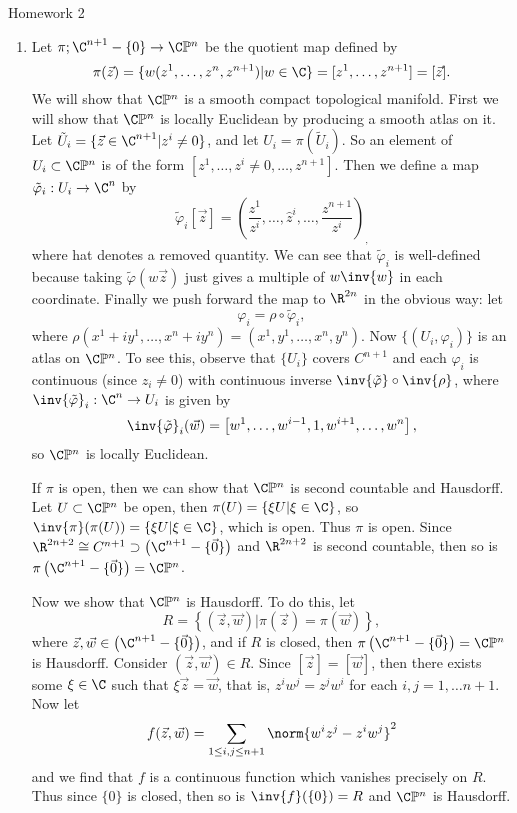 \documentclass[12pt,letterpaper]{article}
\newcommand{\CP}{\C\mathbb{P}}
\let\temp\phi
\let\phi\varphi
\let\varphi\temp
\begin{document}
\pagestyle{fancy}
\begin{center}
{\Large Homework 2}%
\end{center}

\begin{enumerate}
\item Let $\pi;\C^{n+1}-\{0\}\to\C\mathbb{P}^n$ be the quotient map defined by 
$$\pi(\vec{z})=\{w(z^1, \dots, z^n, z^{n+1}) | w\in\C\} = [z^1, \dots, z^{n+1}]=[\vec{z}].$$
We will show that $\CP^n$ is a smooth compact topological manifold. First we will show that $\CP^n$ is locally Euclidean by producing a smooth atlas on it. Let $\tilde{U}_i=\{\vec{z}\in\C^{n+1}|z^i\neq0\}$, and let $U_i=\pi\left(\tilde{U}_i\right)$. So an element of $U_i\subset \CP^n$ is of the form $[z^1, \dots, z^i\neq0, \dots, z^{n+1}]$. Then we define a map $\tilde{\phi}_i:U_i\to\C^n$ by 
$$\tilde{\phi}_i[\vec{z}]=\left(\frac{z^1}{z^i}, \dots, \hat{z}^i, \dots, \frac{z^{n+1}}{z^i} \right)_,$$
where hat denotes a removed quantity. 
We can see that $\tilde{\phi}_i$ is well-defined because taking $\tilde{\phi}(w\vec{z})$ just gives a multiple of $w\inv{w}$ in each coordinate. Finally we push forward the map to $\R^{2n}$ in the obvious way: let 
$$\phi_i=\rho\circ\tilde{\phi}_i,$$ 
where $\rho(x^1+iy^1, \dots, x^n+iy^n)=(x^1, y^1, \dots, x^n, y^n)$. 
Now $\{\left(U_i,\phi_i\right)\}$ is an atlas on $\CP^n$. 
To see this, observe that $\{U_i\}$ covers $C^{n+1}$ and each $\phi_i$ is continuous (since $z_i\neq0$) with continuous inverse $\inv{\tilde{\phi}}\circ\inv{\rho}$, where $\inv{\tilde{\phi}}_i:\C^n\to U_i$ is given by 
$$\inv{\tilde{\phi}}_i(\vec{w})=\left[w^1, \dots, w^{i-1}, 1, w^{i+1},\dots, w^n\right],$$
so $\CP^n$ is locally Euclidean. \qedwhite

If $\pi$ is open, then we can show that $\CP^n$ is second countable and Hausdorff. Let $U\subset\CP^n$ be open, then $\pi(U)=\{\xi U | \xi \in \C\}$, so $\inv{\pi}(\pi(U))=\{\xi U | \xi \in \C\}$, which is open. Thus $\pi$ is open. Since $\R^{2n+2}\cong C^{n+1} \supset \left(\C^{n+1}-\{\vec{0}\}\right)$ and $\R^{2n+2}$ is second countable, then so is $\pi\left(\C^{n+1}-\{\vec{0}\}\right)=\CP^n$. 

Now we show that $\CP^n$ is Hausdorff. To do this, let 
$$R=\left\lbrace(\vec{z},\vec{w})  \vert \pi(\vec{z})=\pi(\vec{w})\right\rbrace,$$
where $\vec{z},\vec{w} \in\left(\C^{n+1}-\{\vec{0}\}\right)$, and if $R$ is closed, then $\pi\left(\C^{n+1}-\{\vec{0}\}\right)=\CP^n$ is Hausdorff. Consider $(\vec{z},\vec{w})\in R$. Since $[\vec{z}]=[\vec{w}]$, then there exists some $\xi\in\C$ such that $\xi\vec{z}=\vec{w}$, that is, $z^iw^j=z^jw^i$ for each $i,j=1,\dots n+1$. Now let 
$$f(\vec{z},\vec{w})=\sum_{1\leq i,j \leq n+1}\norm{w^iz^j-z^iw^j}^2$$
and we find that $f$ is a continuous function which vanishes precisely on $R$. Thus since $\{0\}$ is closed, then so is $\inv{f}(\{0\})=R$ and $\CP^n$ is Hausdorff. \qedwhite


\end{enumerate}
\end{document}
